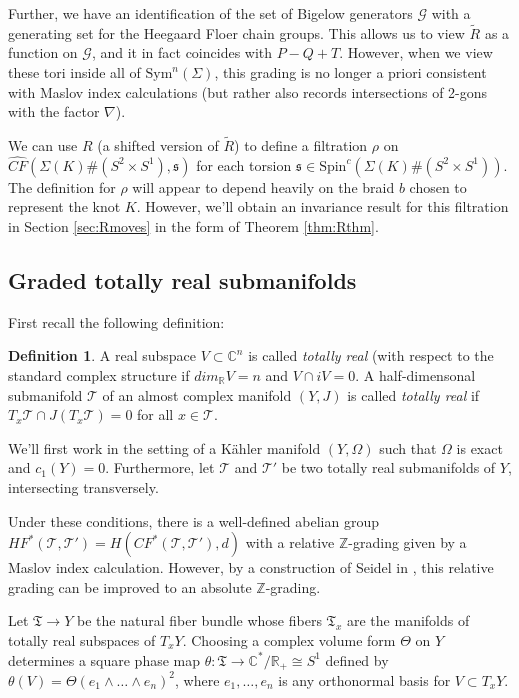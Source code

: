 \documentclass[11pt]{article}
\theoremstyle{plain} \newtheorem{thm}{Theorem}[subsection]
\theoremstyle{plain} \newtheorem{cor}[thm]{Corollary}
\theoremstyle{plain} \newtheorem{prop}[thm]{Proposition}
\theoremstyle{plain} \newtheorem{conj}[thm]{Conjecture}
\theoremstyle{plain} \newtheorem{lem}[thm]{Lemma}
\theoremstyle{definition} \newtheorem{df}[thm]{Definition}
\theoremstyle{remark} \newtheorem{rmk}[thm]{Remark}
\theoremstyle{remark} \newtheorem{obs}[thm]{Observation}
\newcommand{\DBCs}[1]{\Sigma(#1)\#(S^{2}\times S^{1})}
\newcommand{\G}{\mathcal{G}}
\newcommand{\tld}[1]{\widetilde{#1}}
\newcommand{\CFxs}[1]{\widehat{CF}(\DBCs{#1}, \mathfrak{s})}
\newcommand{\AD}{\nabla}
\begin{document}
Further, we have an identification of the set of Bigelow generators $\G$ with a generating set for the Heegaard Floer chain groups.  This allows us to view $\tld{R}$ as a function on $\G$, and it in fact coincides with $ P - Q + T$.  However, when we view these tori inside all of $\text{Sym}^{n}(\Sigma)$, this grading is no longer a priori consistent with Maslov index calculations (but rather also records intersections of 2-gons with the factor $\AD$).

We can use $R$ (a shifted version of $\tld{R}$) to define a filtration $\rho$ on $\CFxs{K}$ for each torsion $\mathfrak{s} \in \text{Spin}^{c}(\DBCs{K})$.  The definition for $\rho$ will appear to depend heavily on the braid $b$ chosen to represent the knot $K$.  However, we'll obtain an invariance result for this filtration in Section \ref{sec:Rmoves} in the form of Theorem \ref{thm:Rthm}.

\subsection{Graded totally real submanifolds} \label{sec:totreal}

First recall the following definition:

\begin{df}
A real subspace $V \subset \mathbb{C}^{n}$ is called \textit{totally real} (with respect to the standard complex structure if $dim_{\mathbb{R}}V = n$ and $V \cap iV = 0.$  A half-dimensonal submanifold $\mathcal{T}$ of an almost complex manifold $(Y,J)$ is called \textit{totally real} if $T_{x}\mathcal{T} \cap J(T_{x}\mathcal{T}) = 0$ for all $x \in \mathcal{T}$.
\end{df}
We'll first work in the setting of a K\"ahler manifold $(Y,\Omega)$ such that $\Omega$ is exact and $c_{1}(Y) = 0$.  Furthermore, let $\mathcal{T}$ and $\mathcal{T}'$ be two totally real submanifolds of $Y$, intersecting transversely.

Under these conditions, there is a well-defined abelian group $HF^{*}(\mathcal{T}, \mathcal{T}') = H(CF^{*}(\mathcal{T}, \mathcal{T}'),d)$ with a relative $\mathbb{Z}$-grading given by a Maslov index calculation.  However, by a construction of Seidel in \cite{s:GL}, this relative grading can be improved to an absolute $\mathbb{Z}$-grading.

Let $\mathfrak{T} \rightarrow Y$ be the natural fiber bundle whose fibers $\mathfrak{T}_{x}$ are the manifolds of totally real subspaces of $T_{x}Y$.  Choosing a complex volume form $\Theta$ on $Y$ determines a square phase map $\theta: \mathfrak{T} \rightarrow \mathbb{C}^{*} / \mathbb{R}_{+} \cong S^{1}$ defined by $\theta(V) = \Theta(e_{1} \wedge \ldots \wedge e_{n})^{2}$, where $e_{1}, \ldots , e_{n}$ is any orthonormal basis for $V \subset T_{x}Y.$
\end{document}
